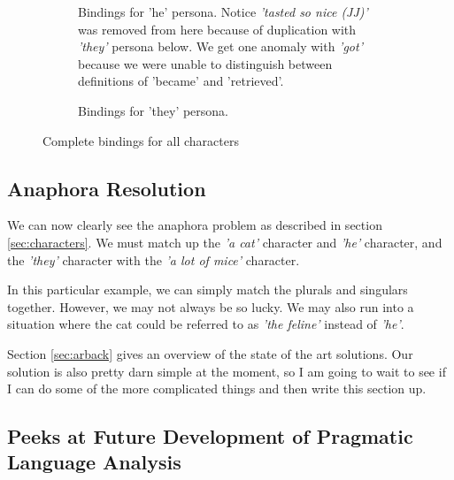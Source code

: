 \begin{figure}[h!]
\begin{subfigure}[t]{0.9\textwidth}
\begin{tikzpicture}[->, node distance=4.5cm,main node/.style={circle, draw, font=\sffamily\bfseries}]
        \end{tikzpicture}
    \caption{Bindings for 'he' persona. Notice \textit{'tasted so nice (JJ)'} was removed from here because of duplication with \textit{'they'} persona below. We get one anomaly with \textit{'got'} because we were unable to distinguish between definitions of 'became' and 'retrieved'.}
\end{subfigure}
\begin{subfigure}[t]{0.9\textwidth}
	\centering
    \caption{Bindings for 'they' persona.}
\end{subfigure}
\caption{Complete bindings for all characters}
\label{all-binded}
\end{figure}

\subsection{Anaphora Resolution}
\label{sec:ar}
We can now clearly see the anaphora problem as described in section \ref{sec:characters}. We must match up the \textit{'a cat'} character and \textit{'he'} character, and the \textit{'they'} character with the \textit{'a lot of mice'} character. 

In this particular example, we can simply match the plurals and singulars together. However, we may not always be so lucky. We may also run into a situation where the cat could be referred to as \textit{'the feline'} instead of \textit{'he'}.

Section \ref{sec:arback} gives an overview of the state of the art solutions. Our solution is also pretty darn simple at the moment, so I am going to wait to see if I can do some of the more complicated things and then write this section up.


\subsection{Peeks at Future Development of Pragmatic Language Analysis}

